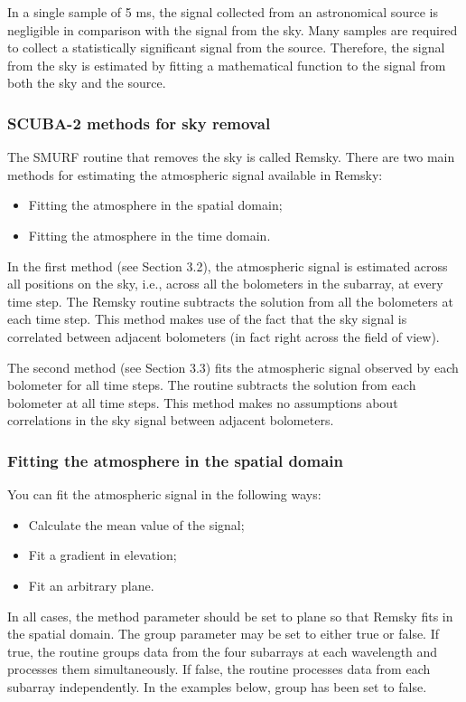 \documentclass[twoside,11pt]{article}
\renewcommand{\_}{\texttt{\symbol{95}}}
\begin{document}
In a single sample of 5 ms, the signal collected from an astronomical
source is negligible in comparison with the signal from the sky. Many
samples are required to collect a statistically significant signal
from the source. Therefore, the signal from the sky is estimated by
fitting a mathematical function to the signal from both the sky and
the source.

\subsubsection{SCUBA-2 methods for sky removal}

The SMURF routine that removes the sky is called Remsky. There are two main
methods for estimating the atmospheric signal available in Remsky:
\begin{itemize}
\item Fitting the atmosphere in the spatial domain;
\item Fitting the atmosphere in the time domain.
\end{itemize}

In the first method (see Section 3.2), the atmospheric signal is
estimated across all positions on the sky, i.e., across all the
bolometers in the subarray, at every time step. The Remsky routine
subtracts the solution from all the bolometers at each time step. This
method makes use of the fact that the sky signal is correlated between
adjacent bolometers (in fact right across the field of view).

The second method (see Section 3.3) fits the atmospheric signal
observed by each bolometer for all time steps. The routine subtracts
the solution from each bolometer at all time steps. This method makes
no assumptions about correlations in the sky signal between adjacent
bolometers.

\subsubsection{Fitting the atmosphere in the spatial domain}

You can fit the atmospheric signal in the following ways:
\begin{itemize}
\item  Calculate the mean value of the signal;
\item  Fit a gradient in elevation;
\item  Fit an arbitrary plane.
\end{itemize}
In all cases, the method parameter should be set to plane so that
Remsky fits in the spatial domain. The group parameter may be set to
either true or false. If true, the routine groups data from the four
subarrays at each wavelength and processes them simultaneously. If
false, the routine processes data from each subarray independently. In
the examples below, group has been set to false.
\end{document}
